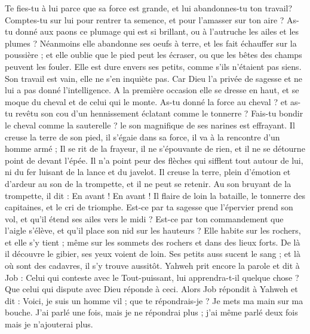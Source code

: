 \begin{multicols}{2}
Te fies-tu à lui parce que sa force est grande, et lui abandonnes-tu ton travail? 
Comptes-tu sur lui pour rentrer ta semence, et pour l'amasser sur ton aire ? 
As-tu donné aux paons ce plumage qui est si brillant, ou à l'autruche les ailes et les plumes ? 
Néanmoins elle abandonne ses oeufs à terre, et les fait échauffer sur la poussière ;
et elle oublie que le pied peut les écraser, ou que les bêtes des champs peuvent les fouler. 
Elle est dure envers ses petits, comme s’ils n’étaient pas siens. Son travail est vain, elle ne s’en inquiète pas.
Car Dieu l'a privée de sagesse et ne lui a pas donné l'intelligence.
A la première occasion elle se dresse en haut, et se moque du cheval et de celui qui le monte. 
As-tu donné la force au cheval ? et as-tu revêtu son cou d'un hennissement éclatant comme le tonnerre ? 
Fais-tu bondir le cheval comme la sauterelle ? le son magnifique de ses narines est effrayant.
Il creuse la terre de son pied, il s'égaie dans sa force, il va à la rencontre d'un homme armé ;
Il se rit de la frayeur, il ne s'épouvante de rien, et il ne se détourne point de devant l'épée.
Il n'a point peur des flèches qui sifflent tout autour de lui, ni du fer luisant de la lance et du javelot. 
Il creuse la terre, plein d'émotion et d'ardeur au son de la trompette, et il ne peut se retenir. 
Au son bruyant de la trompette, il dit : En avant ! En avant ! Il flaire de loin la bataille, le tonnerre des capitaines, et le cri de triomphe.
Est-ce par ta sagesse que l'épervier prend son vol, et qu'il étend ses ailes vers le midi ?
Est-ce par ton commandement que l'aigle s'élève, et qu'il place son nid sur les hauteurs ?
Elle habite sur les rochers, et elle s'y tient ; même sur les sommets des rochers et dans des lieux forts. 
De là il découvre le gibier, ses yeux voient de loin.
Ses petits auss sucent le sang ; et là où sont des cadavres, il s'y trouve aussitôt.
Yahweh prit encore la parole et dit à Job :
Celui qui conteste avec le Tout-puissant, lui apprendra-t-il quelque chose ? Que celui qui dispute avec Dieu réponde à ceci.
Alors Job répondit à Yahweh et dit :
Voici, je suis un homme vil ; que te répondrais-je ? Je mets ma main sur ma bouche.
J'ai parlé une fois, mais je ne répondrai plus ; j'ai même parlé deux fois mais je n'ajouterai plus.

\end{multicols}
